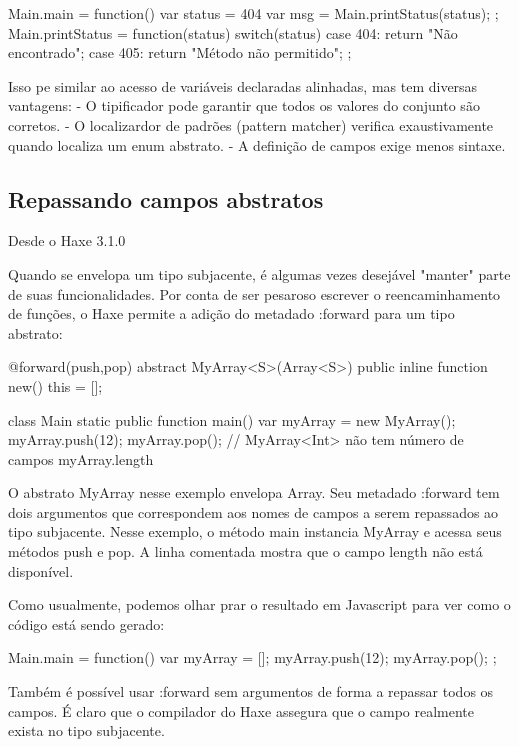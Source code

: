 {{{{Main.main = function() {
   var status = 404
   var msg = Main.printStatus(status);
};
Main.printStatus = function(status) {
    switch(status) {
    case 404:
        return 	"Não encontrado";
    case 405:
        return   "Método não permitido";
    }
};

Isso pe similar ao acesso de variáveis declaradas alinhadas, mas tem diversas vantagens:
   - O tipificador pode garantir que todos os valores do conjunto são corretos.
   - O localizardor de padrões (pattern matcher) verifica exaustivamente quando localiza um enum abstrato.
   - A definição de campos exige menos sintaxe.

\subsection{Repassando campos abstratos}

Desde o Haxe 3.1.0

Quando se envelopa um tipo subjacente, é algumas vezes desejável "manter" parte de suas funcionalidades. Por conta de ser pesaroso escrever o reencaminhamento de funções, o Haxe permite a adição do metadado :forward para um tipo abstrato:

@forward(push,pop)
abstract MyArray<S>(Array<S>) {
    public inline function new() {
        this = [];
    }
}

class Main {
    static public function main() {
        var myArray = new MyArray();
        myArray.push(12);
        myArray.pop();
        // MyArray<Int> não tem número de campos myArray.length
    }
}

O abstrato MyArray nesse exemplo envelopa Array. Seu metadado :forward tem dois argumentos que correspondem aos nomes de campos a serem repassados ao tipo subjacente. Nesse exemplo, o método main instancia MyArray e acessa seus métodos push e pop. A linha comentada mostra que o campo length não está disponível.

Como usualmente, podemos olhar prar o resultado em Javascript para ver como o código está sendo gerado:

Main.main = function() {
    var myArray = [];
    myArray.push(12);
    myArray.pop();
};

Também é possível usar :forward  sem argumentos de forma a repassar todos os campos. É claro que o compilador do Haxe assegura que o campo realmente exista no tipo subjacente.

}}}}

